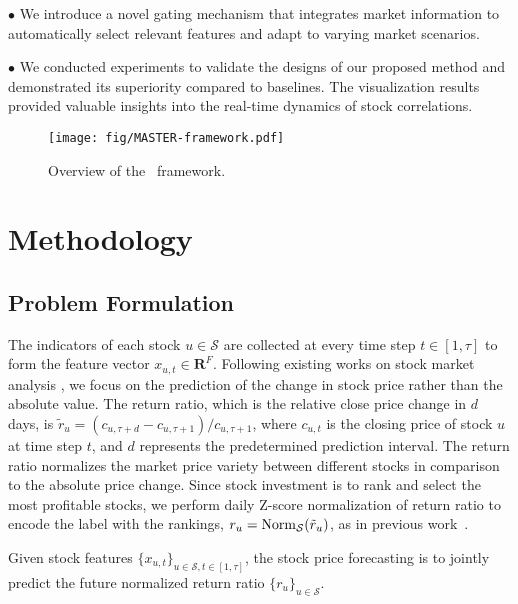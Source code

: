 $\bullet$ We introduce a novel gating mechanism that integrates market information to automatically select relevant features and adapt to varying market scenarios. 

$\bullet$ We conducted experiments to validate the designs of our proposed method and demonstrated its superiority compared to baselines. The visualization results provided valuable insights into the real-time dynamics of stock correlations.
 
\begin{figure*}
    \centering
    \texttt{[image: fig/MASTER-framework.pdf]}
    \caption{Overview of the \frameworkname~framework.}
    \label{fig:framework}
\end{figure*}
\section{Methodology}

\subsection{Problem Formulation}
The indicators of each stock $u\in \mathcal{S}$ are collected at every time step $t\in[1,\tau]$ to form the feature vector $x_{u,t} \in \mathbf{R}^F$.
Following existing works on stock market analysis \cite{feng2018enhancing, sawhney2020spatiotemporal, huynh2023efficient}, we focus on the prediction of the change in stock price rather than the absolute value. 
The return ratio, which is the relative close price change in $d$ days, is $\tilde{r}_{u}=(c_{u,\tau+d}-c_{u,\tau+1})/c_{u,\tau+1}$, where $c_{u,t}$ is the closing price of stock $u$ at time step $t$, and $d$ represents the predetermined prediction interval.
The return ratio normalizes the market price variety between different stocks in comparison to the absolute price change.
Since stock investment is to rank and select the most profitable stocks, we perform daily Z-score normalization of return ratio to encode the label with the rankings, $r_{u}={\rm Norm}_\mathcal{S}(\tilde{r}_{u})$, as in previous work~\cite{yang2020qlib}.

\begin{definition}
Given stock features $\{x_{u,t}\}_{u\in \mathcal{S},t\in [1, \tau]}$, the stock price forecasting is to jointly predict the future normalized return ratio $\{r_{u}\}_{u\in \mathcal{S}}$.
\end{definition}

